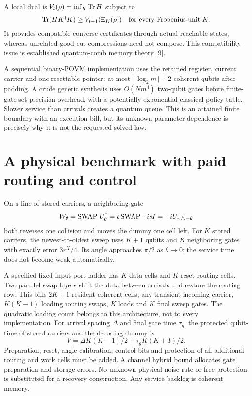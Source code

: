 A local dual is $V_t(\rho)=\inf_H\operatorname{Tr} H$ subject to
\[
 \operatorname{Tr}(HK^\dagger K)\ge V_{t-1}(\Xi_K(\rho))
 \quad\hbox{for every Frobenius-unit }K.
\]
It provides compatible converse certificates through actual reachable
states, whereas unrelated good cut compressions need not compose. This
compatibility issue is established quantum-comb memory theory [9].

A sequential binary-POVM implementation uses the retained register, current
carrier and one resettable pointer: at most $\lceil\log_2m\rceil+2$ coherent
qubits after padding. A crude generic synthesis uses $O(Nm^4)$ two-qubit
gates before finite-gate-set precision overhead, with a potentially exponential
classical policy table. Slower service than arrivals creates a quantum queue.
This is an attained finite boundary with an execution bill, but its unknown
parameter dependence is precisely why it is not the requested solved law.

\section{A physical benchmark with paid routing and control}
On a line of stored carriers, a neighboring gate
\[
 W_\theta=\operatorname{SWAP}\,U_\theta^\dagger=c\operatorname{SWAP}-isI=-iU_{\pi/2-\theta}
\]
both reverses one collision and moves the dummy one cell left. For $K$
stored carriers, the newest-to-oldest sweep uses $K+1$ qubits and $K$
neighboring gates with exactly error $3r^K/4$. Its angle approaches
$\pi/2$ as $\theta\to0$; the service time does not become weak automatically.

A specified fixed-input-port ladder has $K$ data cells and $K$ reset routing
cells. Two parallel swap layers shift the data between arrivals and restore
the routing row. This bills $2K+1$ resident coherent cells, any transient
incoming carrier, $K(K-1)$ loading routing swaps, $K$ loads and $K$ final
sweep gates. The quadratic loading count belongs to this architecture, not
to every implementation. For arrival spacing $\Delta$ and final gate time
$\tau_g$, the protected qubit-time of stored carriers and the decoding dummy is
\[
 V=\Delta K(K-1)/2+\tau_g K(K+3)/2.
\]
Preparation, reset, angle calibration, control bits and protection of all
additional routing and work cells must be added. A channel hybrid bound allocates gate,
preparation and storage errors. No unknown physical noise rate or free
protection is substituted for a recovery construction. Any service backlog
is coherent memory.

